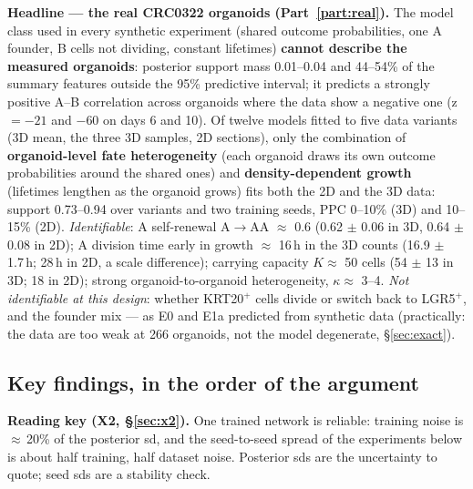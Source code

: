 \documentclass[10pt,a4paper]{article}
\begin{document}
\begin{keybox}
\textbf{Headline --- the real CRC0322 organoids (Part~\ref{part:real}).} The model class used in every synthetic experiment (shared outcome probabilities, one A founder, B cells not dividing, constant lifetimes) \textbf{cannot describe the measured organoids}: posterior support mass 0.01--0.04 and 44--54\% of the summary features outside the 95\% predictive interval; it predicts a strongly positive A--B correlation across organoids where the data show a negative one (z $=-21$ and $-60$ on days 6 and 10). Of twelve models fitted to five data variants (3D mean, the three 3D samples, 2D sections), only the combination of \textbf{organoid-level fate heterogeneity} (each organoid draws its own outcome probabilities around the shared ones) and \textbf{density-dependent growth} (lifetimes lengthen as the organoid grows) fits both the 2D and the 3D data: support 0.73--0.94 over variants and two training seeds, PPC 0--10\% (3D) and 10--15\% (2D). \emph{Identifiable}: A self-renewal A$\to$AA $\approx$ 0.6 (0.62 $\pm$ 0.06 in 3D, 0.64 $\pm$ 0.08 in 2D); A division time early in growth $\approx$ 16\,h in the 3D counts (16.9 $\pm$ 1.7\,h; 28\,h in 2D, a scale difference); carrying capacity $K \approx$ 50 cells (54 $\pm$ 13 in 3D; 18 in 2D); strong organoid-to-organoid heterogeneity, $\kappa \approx$ 3--4. \emph{Not identifiable at this design}: whether KRT20$^+$ cells divide or switch back to LGR5$^+$, and the founder mix --- as E0 and E1a predicted from synthetic data (practically: the data are too weak at 266 organoids, not the model degenerate, \S\ref{sec:exact}).
\end{keybox}

\subsection*{Key findings, in the order of the argument}

\textbf{Reading key (X2, \S\ref{sec:x2}).} One trained network is reliable: training noise is $\approx$\,20\% of the posterior sd, and the seed-to-seed spread of the experiments below is about half training, half dataset noise. Posterior sds are the uncertainty to quote; seed sds are a stability check.
\end{document}
